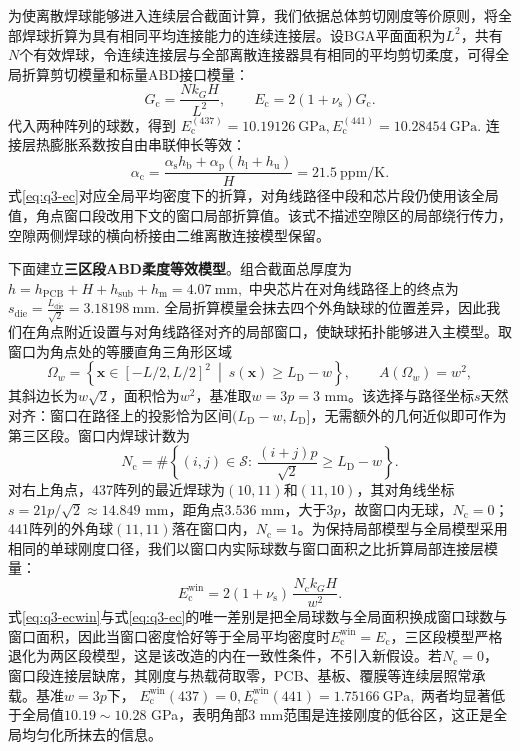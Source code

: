 \documentclass[draft,12pt,a4paper]{ctexart}
\theoremstyle{definition}
\begin{document}
为使离散焊球能够进入连续层合截面计算，我们依据总体剪切刚度等价原则，将全部焊球折算为具有相同平均连接能力的连续连接层。设BGA平面面积为$L^2$，共有$N$个有效焊球，令连续连接层与全部离散连接器具有相同的平均剪切柔度，可得全局折算剪切模量和标量ABD接口模量：
\begin{equation}\label{eq:q3-ec}
G_{\mathrm c}=\frac{Nk_GH}{L^2},\qquad
E_{\mathrm c}=2(1+\nu_{\mathrm s})G_{\mathrm c}.
\end{equation}
代入两种阵列的球数，得到
$
E_{\mathrm c}^{(437)}=10.19126\ \mathrm{GPa},
E_{\mathrm c}^{(441)}=10.28454\ \mathrm{GPa}.
$
连接层热膨胀系数按自由串联伸长等效：
\begin{equation}\label{eq:q3-alphac}
\alpha_{\mathrm c}
=\frac{\alpha_{\mathrm s}h_{\mathrm b}
+\alpha_{\mathrm p}(h_{\mathrm l}+h_{\mathrm u})}{H}
=21.5\ \mathrm{ppm/K}.
\end{equation}
式\eqref{eq:q3-ec}对应全局平均密度下的折算，对角线路径中段和芯片段仍使用该全局值，角点窗口段改用下文的窗口局部折算值。该式不描述空隙区的局部绕行传力，空隙两侧焊球的横向桥接由二维离散连接模型保留。

下面建立\textbf{三区段ABD柔度等效模型}。组合截面总厚度为
$
h=h_{\mathrm{PCB}}+H+h_{\mathrm{sub}}+h_{\mathrm m}=4.07\ \mathrm{mm},
$
中央芯片在对角线路径上的终点为
$
s_{\mathrm{die}}=\frac{L_{\mathrm{die}}}{\sqrt2}=3.18198\ \mathrm{mm}.
$
全局折算模量会抹去四个外角缺球的位置差异，因此我们在角点附近设置与对角线路径对齐的局部窗口，使缺球拓扑能够进入主模型。取窗口为角点处的等腰直角三角形区域
\begin{equation}\label{eq:q3-window}
\Omega_w=\left\{\mathbf x\in[-L/2,L/2]^2\ \middle|\ s(\mathbf x)\ge L_{\mathrm D}-w\right\},
\qquad
A(\Omega_w)=w^2,
\end{equation}
其斜边长为$w\sqrt2$，面积恰为$w^2$，基准取$w=3p=3$ mm。该选择与路径坐标$s$天然对齐：窗口在路径上的投影恰为区间$(L_{\mathrm D}-w,L_{\mathrm D}]$，无需额外的几何近似即可作为第三区段。窗口内焊球计数为
\begin{equation}\label{eq:q3-nc}
N_{\mathrm c}=\#\left\{(i,j)\in\mathcal S:\ \frac{(i+j)p}{\sqrt2}\ge L_{\mathrm D}-w\right\}.
\end{equation}
对右上角点，437阵列的最近焊球为$(10,11)$和$(11,10)$，其对角线坐标$s=21p/\sqrt2\approx14.849$ mm，距角点$3.536$ mm，大于$3p$，故窗口内无球，$N_{\mathrm c}=0$；441阵列的外角球$(11,11)$落在窗口内，$N_{\mathrm c}=1$。为保持局部模型与全局模型采用相同的单球刚度口径，我们以窗口内实际球数与窗口面积之比折算局部连接层模量：
\begin{equation}\label{eq:q3-ecwin}
E_{\mathrm c}^{\mathrm{win}}
=2(1+\nu_{\mathrm s})\,\frac{N_{\mathrm c}k_GH}{w^2}.
\end{equation}
式\eqref{eq:q3-ecwin}与式\eqref{eq:q3-ec}的唯一差别是把全局球数与全局面积换成窗口球数与窗口面积，因此当窗口密度恰好等于全局平均密度时$E_{\mathrm c}^{\mathrm{win}}=E_{\mathrm c}$，三区段模型严格退化为两区段模型，这是该改造的内在一致性条件，不引入新假设。若$N_{\mathrm c}=0$，窗口段连接层缺席，其刚度与热载荷取零，PCB、基板、覆膜等连续层照常承载。基准$w=3p$下，
$
E_{\mathrm c}^{\mathrm{win}}(437)=0,
E_{\mathrm c}^{\mathrm{win}}(441)=1.75166\ \mathrm{GPa},
$
两者均显著低于全局值$10.19\sim10.28$ GPa，表明角部3 mm范围是连接刚度的低谷区，这正是全局均匀化所抹去的信息。
\end{document}
